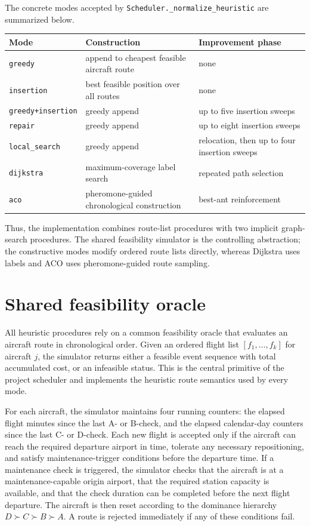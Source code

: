 The concrete modes accepted by \texttt{Scheduler.\_normalize\_heuristic} are summarized below.

\begin{center}
\begin{tabular}{lll}
\toprule
\textbf{Mode} & \textbf{Construction} & \textbf{Improvement phase} \\
\midrule
\texttt{greedy} & append to cheapest feasible aircraft route & none \\
\texttt{insertion} & best feasible position over all routes & none \\
\texttt{greedy+insertion} & greedy append & up to five insertion sweeps \\
\texttt{repair} & greedy append & up to eight insertion sweeps \\
\texttt{local\_search} & greedy append & relocation, then up to four insertion sweeps \\
\texttt{dijkstra} & maximum-coverage label search & repeated path selection \\
\texttt{aco} & pheromone-guided chronological construction & best-ant reinforcement \\
\bottomrule
\end{tabular}
\end{center}

Thus, the implementation combines route-list procedures with two implicit graph-search procedures. The shared feasibility simulator is the controlling abstraction; the constructive modes modify ordered route lists directly, whereas Dijkstra uses labels and ACO uses pheromone-guided route sampling.

\section{Shared feasibility oracle}
\label{sec:heuristic_oracle}

All heuristic procedures rely on a common feasibility oracle that evaluates an aircraft route in chronological order. Given an ordered flight list $[f_1,\ldots,f_k]$ for aircraft $j$, the simulator returns either a feasible event sequence with total accumulated cost, or an infeasible status. This is the central primitive of the project scheduler and implements the heuristic route semantics used by every mode.

For each aircraft, the simulator maintains four running counters: the elapsed flight minutes since the last A- or B-check, and the elapsed calendar-day counters since the last C- or D-check. Each new flight is accepted only if the aircraft can reach the required departure airport in time, tolerate any necessary repositioning, and satisfy maintenance-trigger conditions before the departure time. If a maintenance check is triggered, the simulator checks that the aircraft is at a maintenance-capable origin airport, that the required station capacity is available, and that the check duration can be completed before the next flight departure. The aircraft is then reset according to the dominance hierarchy $D \succ C \succ B \succ A$. A route is rejected immediately if any of these conditions fail.

